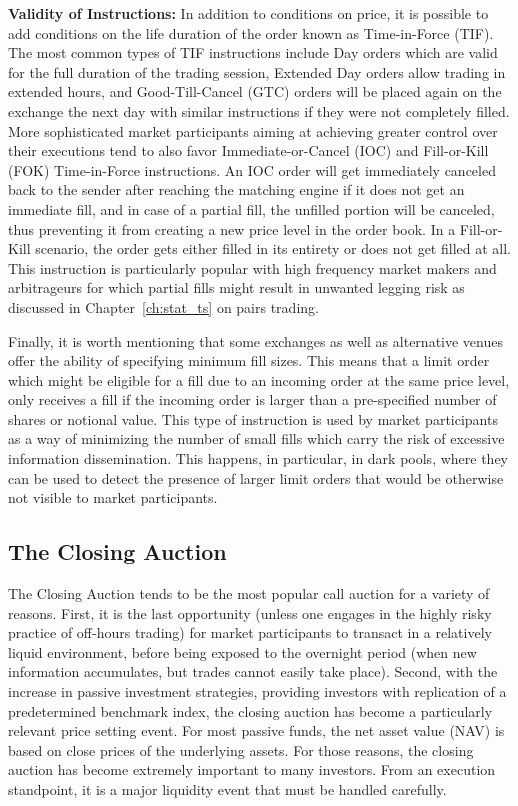 \noindent\textbf{Validity of Instructions:} In addition to conditions on price, it is possible to add conditions on the life duration of the order known as Time-in-Force (TIF). The most common types of TIF instructions include Day orders which are valid for the full duration of the trading session, Extended Day orders allow trading in extended hours, and Good-Till-Cancel (GTC) orders will be placed again on the exchange the next day with similar instructions if they were not completely filled. More sophisticated market participants aiming at achieving greater control over their executions tend to also favor Immediate-or-Cancel (IOC) and Fill-or-Kill (FOK) Time-in-Force instructions. An IOC order will get immediately canceled back to the sender after reaching the matching engine if it does not get an immediate fill, and in case of a partial fill, the unfilled portion will be canceled, thus preventing it from creating a new price level in the order book. In a Fill-or-Kill scenario, the order gets either filled in its entirety or does not get filled at all. This instruction is particularly popular with high frequency market makers and arbitrageurs for which partial fills might result in unwanted legging risk as discussed in Chapter~\ref{ch:stat_ts} on pairs trading.

Finally, it is worth mentioning that some exchanges as well as alternative venues offer the ability of specifying minimum fill sizes. This means that a limit order which might be eligible for a fill due to an incoming order at the same price level, only receives a fill if the incoming order is larger than a pre-specified number of shares or notional value. This type of instruction is used by market participants as a way of minimizing the number of small fills which carry the risk of excessive information dissemination. This happens, in particular, in dark pools, where they can be used to detect the presence of larger limit orders that would be otherwise not visible to market participants.  


\subsection{The Closing Auction} 
The Closing Auction tends to be the most popular call auction for a variety of reasons. First, it is the last opportunity (unless one engages in the highly risky practice of off-hours trading) for market participants to transact in a relatively liquid environment, before being exposed to the overnight period (when new information accumulates, but trades cannot easily take place). Second, with the increase in passive investment strategies, providing investors with replication of a predetermined benchmark index, the closing auction has become a particularly relevant price setting event. For most passive funds, the net asset value (NAV) is based on close prices of the underlying assets. For those reasons, the closing auction has become extremely important to many investors. From an execution standpoint, it is a major liquidity event that must be handled carefully.


